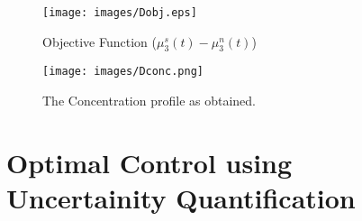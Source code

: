 \documentclass[3p,times]{elsarticle}
\begin{document}
\begin{figure}[h!] 
\begin{center} 
\texttt{[image: images/Dobj.eps]}
\end{center}
\caption{Objective Function ($\mu_{3}^{s}(t) - \mu_{3}^{n}(t)$)} \label{Dobj}
\end{figure}

\begin{figure}[h!] 

\begin{center} 
\texttt{[image: images/Dconc.png]}
\end{center}
\caption{The Concentration profile as obtained.} \label{Dconc}
\end{figure}

\section{Optimal Control using Uncertainity Quantification}
\end{document}
